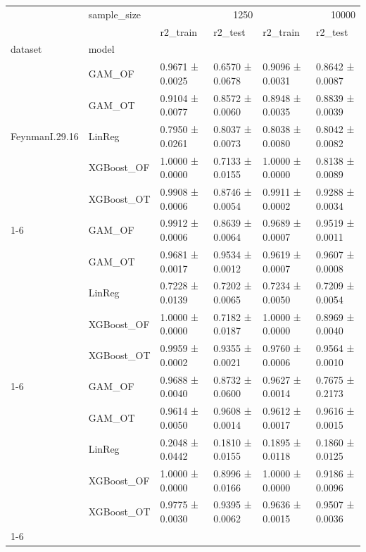 \begin{tabular}{llllll}
\toprule
 & sample_size & \multicolumn{2}{r}{1250} & \multicolumn{2}{r}{10000} \\
 &  & r2_train & r2_test & r2_train & r2_test \\
dataset & model &  &  &  &  \\
\midrule
\multirow[t]{5}{*}{FeynmanI.29.16} & GAM_OF & 0.9671 ± 0.0025 & 0.6570 ± 0.0678 & 0.9096 ± 0.0031 & 0.8642 ± 0.0087 \\
 & GAM_OT & 0.9104 ± 0.0077 & 0.8572 ± 0.0060 & 0.8948 ± 0.0035 & 0.8839 ± 0.0039 \\
 & LinReg & 0.7950 ± 0.0261 & 0.8037 ± 0.0073 & 0.8038 ± 0.0080 & 0.8042 ± 0.0082 \\
 & XGBoost_OF & 1.0000 ± 0.0000 & 0.7133 ± 0.0155 & 1.0000 ± 0.0000 & 0.8138 ± 0.0089 \\
 & XGBoost_OT & 0.9908 ± 0.0006 & 0.8746 ± 0.0054 & 0.9911 ± 0.0002 & 0.9288 ± 0.0034 \\
\cline{1-6}
\multirow[t]{5}{*}{Friedman1} & GAM_OF & 0.9912 ± 0.0006 & 0.8639 ± 0.0064 & 0.9689 ± 0.0007 & 0.9519 ± 0.0011 \\
 & GAM_OT & 0.9681 ± 0.0017 & 0.9534 ± 0.0012 & 0.9619 ± 0.0007 & 0.9607 ± 0.0008 \\
 & LinReg & 0.7228 ± 0.0139 & 0.7202 ± 0.0065 & 0.7234 ± 0.0050 & 0.7209 ± 0.0054 \\
 & XGBoost_OF & 1.0000 ± 0.0000 & 0.7182 ± 0.0187 & 1.0000 ± 0.0000 & 0.8969 ± 0.0040 \\
 & XGBoost_OT & 0.9959 ± 0.0002 & 0.9355 ± 0.0021 & 0.9760 ± 0.0006 & 0.9564 ± 0.0010 \\
\cline{1-6}
\multirow[t]{5}{*}{SimpleNormalCorrelated} & GAM_OF & 0.9688 ± 0.0040 & 0.8732 ± 0.0600 & 0.9627 ± 0.0014 & 0.7675 ± 0.2173 \\
 & GAM_OT & 0.9614 ± 0.0050 & 0.9608 ± 0.0014 & 0.9612 ± 0.0017 & 0.9616 ± 0.0015 \\
 & LinReg & 0.2048 ± 0.0442 & 0.1810 ± 0.0155 & 0.1895 ± 0.0118 & 0.1860 ± 0.0125 \\
 & XGBoost_OF & 1.0000 ± 0.0000 & 0.8996 ± 0.0166 & 1.0000 ± 0.0000 & 0.9186 ± 0.0096 \\
 & XGBoost_OT & 0.9775 ± 0.0030 & 0.9395 ± 0.0062 & 0.9636 ± 0.0015 & 0.9507 ± 0.0036 \\
\cline{1-6}
\bottomrule
\end{tabular}

